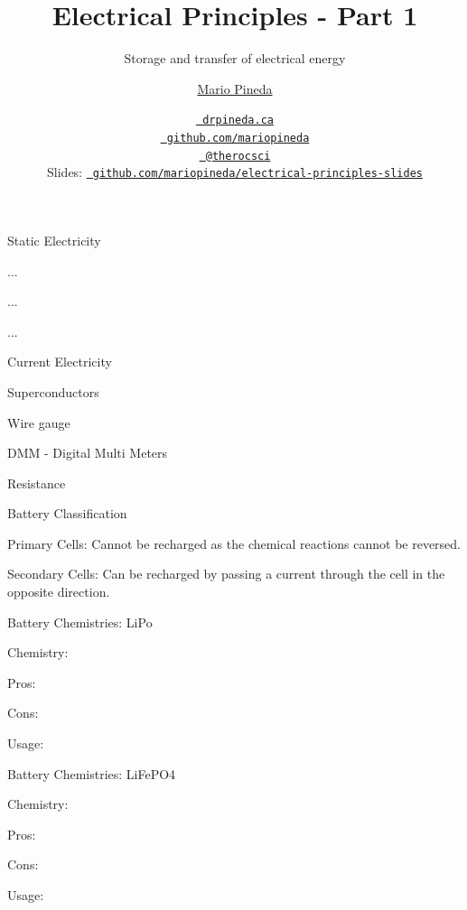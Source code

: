 \documentclass[12pt,t]{beamer}
\title{Electrical Principles - Part 1}
\subtitle{Storage and transfer of electrical energy}
\author{\href{www.drpineda.ca}{Mario Pineda}}
\institute{Queen Elizabeth High School}
\date{\href{www.drpineda.ca}{\tt \scriptsize \color{foreground} drpineda.ca}
\\[-4pt]
\href{https://github.com/mariopineda}{\tt \scriptsize \color{foreground} github.com/mariopineda}
\\[-4pt]
\href{https://twitter.com/therocsci}{\tt \scriptsize \color{foreground} @therocsci}
\\[2pt]
\scriptsize {\lolit Slides:} \href{https://github.com/mariopineda/electrical-principles-slides}{\tt \scriptsize
  \color{foreground} github.com/mariopineda/electrical-principles-slides}
}
\begin{document}
{
}

\begin{frame}[c]{Static Electricity}
\vspace{-20mm}
\bbi
\item ... 
\item ...
\item ...
\ei
\end{frame}

\begin{frame}[c]{Current Electricity}
\vspace{-20mm}
\bbi
\item Superconductors
\item Wire gauge
\item DMM - Digital Multi Meters 
\item Resistance
\ei
\end{frame}

\begin{frame}[c]{}

\end{frame}

\begin{frame}[c]{Battery Classification}
\bbi
\item Primary Cells: Cannot be recharged as the chemical reactions cannot be reversed.
\item Secondary Cells: Can be recharged by passing a current through the cell in the opposite direction.
\ei
\end{frame}

\begin{frame}[c]{Battery Chemistries: LiPo }
\bbi
\item Chemistry:
\item Pros: 
\item Cons:
\item Usage:
\ei
\end{frame}

\begin{frame}[c]{Battery Chemistries: LiFePO4 }
\bbi    
\item Chemistry:
\item Pros:     
\item Cons:
\item Usage:
\ei     
\end{frame}
\end{document}
